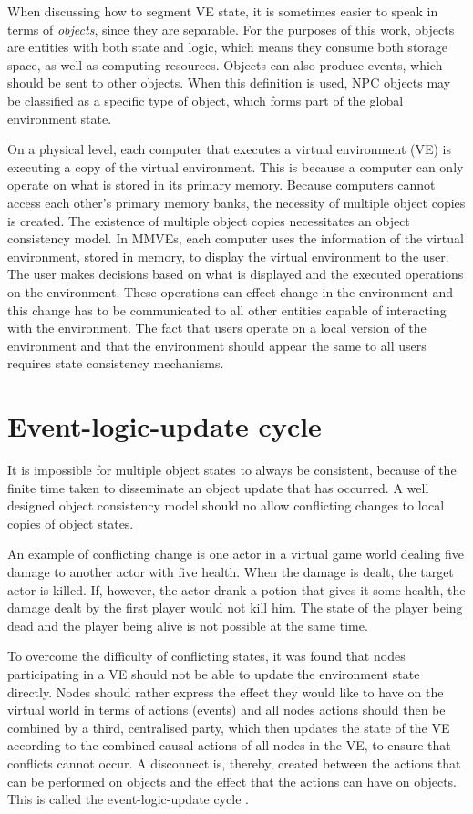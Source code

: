 When discussing how to segment VE state, it is sometimes easier to speak in terms of \emph{objects}, since they are separable. For the purposes of this work, objects are entities with both state and logic, which means they consume both storage space, as well as computing resources. Objects can also produce events, which should be sent to other objects. When this definition is used, NPC objects may be classified as a specific type of object, which forms part of the global environment state.

On a physical level, each computer that executes a virtual environment (VE) is executing a copy of the virtual environment. This is because a computer can only operate on what is stored in its primary memory. Because computers cannot access each other's primary memory banks, the necessity of multiple object copies is created. The existence of multiple object copies necessitates an object consistency model. In MMVEs, each computer uses the information of the virtual environment, stored in memory, to display the virtual environment to the user. The user makes decisions based on what is displayed and the executed operations on the environment. These operations can effect change in the environment and this change has to be communicated to all other entities capable of interacting with the environment. The fact that users operate on a local version of the environment and that the environment should appear the same to all users requires state consistency mechanisms.

\section{Event-logic-update cycle}
\label{event_logic_update}

It is impossible for multiple object states to always be consistent, because of the finite time taken to disseminate an object update that has occurred. A well designed object consistency model should no allow conflicting changes to local copies of object states.

An example of conflicting change is one actor in a virtual game world dealing five damage to another actor with five health. When the damage is dealt, the target actor is killed. If, however, the actor drank a potion that gives it some health, the damage dealt by the first player would not kill him. The state of the player being dead and the player being alive is not possible at the same time.

To overcome the difficulty of conflicting states, it was found that nodes participating in a VE should not be able to update the environment state directly. Nodes should rather express the effect they would like to have on the virtual world in terms of actions (events) and all nodes actions should then be combined by a third, centralised party, which then updates the state of the VE according to the combined causal actions of all nodes in the VE, to ensure that conflicts cannot occur. A disconnect is, thereby, created between the actions that can be performed on objects and the effect that the actions can have on objects. This is called the event-logic-update cycle \cite{}.

